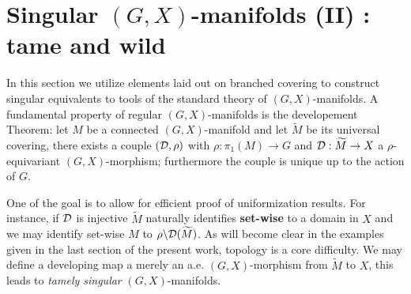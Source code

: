 % 
% 
% 
% 
% 
%  
% 
% 
% 
%  


\section{Singular $(G,X)$-manifolds (II) : tame and wild}\label{sec:GXsing2}

In this section we utilize elements laid out on branched covering to construct singular equivalents to tools of the standard theory of $(G,X)$-manifolds. A fundamental property of regular $(G,X)$-manifolds is the developement Theorem: let $M$ be a connected $(G,X)$-manifold and let $\widetilde M$ be its universal covering, there exists a couple $(\mathcal{D},\rho)$ with $\rho: \pi_1(M)\rightarrow G$ and $\mathcal{D}:\widetilde M\rightarrow X$ a $\rho$-equivariant $(G,X)$-morphism; furthermore the couple is unique up to the action of $G$. 

One of the goal is to allow for efficient proof of uniformization results. For instance, if $\mathcal{D}$ is injective $\widetilde M$ naturally identifies \textbf{set-wise} to a domain in $X$ and we may identify set-wise $M$ to $\rho\backslash\mathcal{D}(\widetilde M)$. As will become clear in the examples given in the last section of the present work, topology is a core difficulty. We may  define a developing map a merely an a.e. $(G,X)$-morphism from $\widetilde M$ to $X$, this leads to {\it tamely singular} $(G,X)$-manifolds. 

